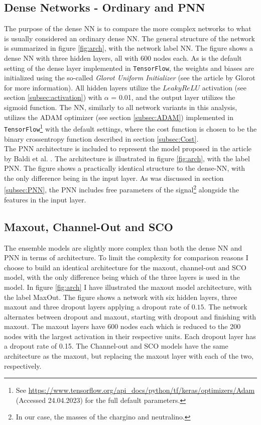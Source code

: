 \subsection*{Dense Networks - Ordinary and PNN}\label{subsec:PNNArch}
The purpose of the dense \ac{NN} is to compare the more complex networks to what is usually considered an ordinary dense \ac{NN}.
The general structure of the network is summarized in figure \ref{fig:arch}, with the network label \ac{NN}. The figure shows a dense \ac{NN} with 
three hidden layers, all with 600 nodes each.  As is the default setting of the dense layer implemented in \verb!TensorFlow!, the weights and biases are initialized 
using the so-called \emph{Glorot Uniform Initializer} (see the article by Glorot \cite{glorot_understanding_2010} for more information). All hidden layers 
utilize the $LeakyReLU$ activation (see section \ref{subsec:activation}) with $\alpha$ = 0.01, and the output layer utilizes the sigmoid function.  
The \ac{NN}, similarly to all network variants in this analysis, utilizes the \ac{ADAM} optimizer (see section \ref{subsec:ADAM}) implemented in 
\verb!TensorFlow!\footnote{See \url{https://www.tensorflow.org/api_docs/python/tf/keras/optimizers/Adam}
(Accessed 24.04.2023) for the full default parameters.} with the default settings, where the cost function is chosen to be the binary crossentropy function described
in section \ref{subsec:Cost}. 
\\
The \ac{PNN} architecture is included to represent the model proposed in the article by Baldi et al. \cite{PNN}.
The architecture is illustrated in figure \ref{fig:arch}, with the label \ac{PNN}. The figure shows a practically identical 
structure to the dense-\ac{NN}, with the only difference being in the input layer. As was discussed in section \ref{subsec:PNN},
the \ac{PNN} includes free parameters of the signal\footnote{In our case, the masses of the chargino and neutralino.} alongside the features
in the input layer.
\subsection*{Maxout, Channel-Out and SCO}
The ensemble models are slightly more complex than both the dense \ac{NN} and \ac{PNN} in terms of architecture. To limit the complexity for comparison reasons
I choose to build an identical architecture for the maxout, channel-out and \ac{SCO} model, with the only difference being which of the three layers is used in the model.  
In figure \ref{fig:arch} I have illustrated the maxout model architecture, with the label MaxOut. The figure shows a network with six hidden layers, 
three maxout and three dropout layers applying a dropout rate of $0.15$. The network alternates between dropout and maxout, starting with dropout and finishing with maxout. The maxout layers 
have 600 nodes each which is reduced to the 200 nodes with the largest activation in their respective units. Each dropout layer has a dropout 
rate of 0.15. The Channel-out and \ac{SCO} models have the same architecture as the maxout, but replacing the maxout layer with each of the two, respectively.  

